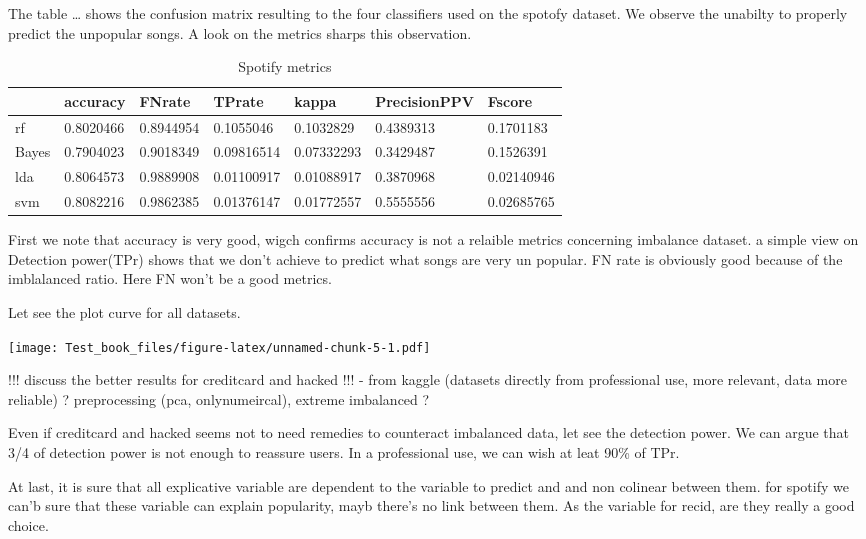 \documentclass[
]{report}
\begin{document}
The table \ldots{} shows the confusion matrix resulting to the four classifiers used on the spotofy dataset. We observe the unabilty to properly predict the unpopular songs. A look on the metrics sharps this observation.

\begin{table}

\caption{\label{tab:unnamed-chunk-4}Spotify metrics}
\centering
\begin{tabular}[t]{l|l|l|l|l|l|l}
\hline
  & accuracy & FNrate & TPrate & kappa & PrecisionPPV & Fscore\\
\hline
rf & 0.8020466 & 0.8944954 & 0.1055046 & 0.1032829 & 0.4389313 & 0.1701183\\
\hline
Bayes & 0.7904023 & 0.9018349 & 0.09816514 & 0.07332293 & 0.3429487 & 0.1526391\\
\hline
lda & 0.8064573 & 0.9889908 & 0.01100917 & 0.01088917 & 0.3870968 & 0.02140946\\
\hline
svm & 0.8082216 & 0.9862385 & 0.01376147 & 0.01772557 & 0.5555556 & 0.02685765\\
\hline
\end{tabular}
\end{table}

First we note that accuracy is very good, wigch confirms accuracy is not a relaible metrics concerning imbalance dataset. a simple view on Detection power(TPr) shows that we don't achieve to predict what songs are very un popular. FN rate is obviously good because of the imblalanced ratio. Here FN won't be a good metrics.

Let see the plot curve for all datasets.

\texttt{[image: Test\_book\_files/figure-latex/unnamed-chunk-5-1.pdf]}

!!! discuss the better results for creditcard and hacked !!!
- from kaggle (datasets directly from professional use, more relevant, data more reliable) ? preprocessing (pca, onlynumeircal), extreme imbalanced ?

Even if creditcard and hacked seems not to need remedies to counteract imbalanced data, let see the detection power. We can argue that 3/4 of detection power is not enough to reassure users. In a professional use, we can wish at leat 90\% of TPr.

At last, it is sure that all explicative variable are dependent to the variable to predict and and non colinear between them. for spotify we can'b sure that these variable can explain popularity, mayb there's no link between them. As the variable for recid, are they really a good choice.
\end{document}
